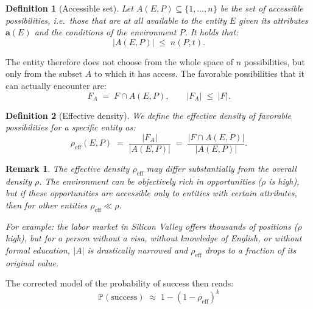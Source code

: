 \documentclass[12pt,a4paper]{article}
\newtheorem{definition}{Definition}[section]
\newtheorem{remark}{Remark}[section]
\begin{document}
\begin{definition}[Accessible set]
Let $A(E, P) \subseteq \{1, \dots, n\}$ be the set of \emph{accessible possibilities}, i.e.\ those that are at all available to the entity $E$ given its attributes $\mathbf{a}(E)$ and the conditions of the environment $P$. It holds that:
\begin{equation}
    |A(E, P)| \;\leq\; n(P, t).
\end{equation}
\end{definition}

The entity therefore does not choose from the whole space of $n$ possibilities, but only from the subset $A$ to which it has access. The favorable possibilities that it can actually encounter are:
\begin{equation}
    F_A \;=\; F \cap A(E, P), \qquad |F_A| \;\leq\; |F|.
\end{equation}

\begin{definition}[Effective density]
We define the \emph{effective density} of favorable possibilities for a specific entity as:
\begin{equation}
    \rho_{\text{eff}}(E, P) \;=\; \frac{|F_A|}{|A(E, P)|} \;=\; \frac{|F \cap A(E, P)|}{|A(E, P)|}.
\end{equation}
\end{definition}

\begin{remark}
The effective density $\rho_{\text{eff}}$ may differ substantially from the overall density $\rho$. The environment can be objectively rich in opportunities ($\rho$ is high), but if these opportunities are accessible only to entities with certain attributes, then for other entities $\rho_{\text{eff}} \ll \rho$.

For example: the labor market in Silicon Valley offers thousands of positions ($\rho$ high), but for a person without a visa, without knowledge of English, or without formal education, $|A|$ is drastically narrowed and $\rho_{\text{eff}}$ drops to a fraction of its original value.
\end{remark}

The corrected model of the probability of success then reads:
\begin{equation}\label{eq:approx_eff}
    \boxed{\;\mathbb{P}(\text{success}) \;\approx\; 1 - (1 - \rho_{\text{eff}})^k\;}
\end{equation}
\end{document}
